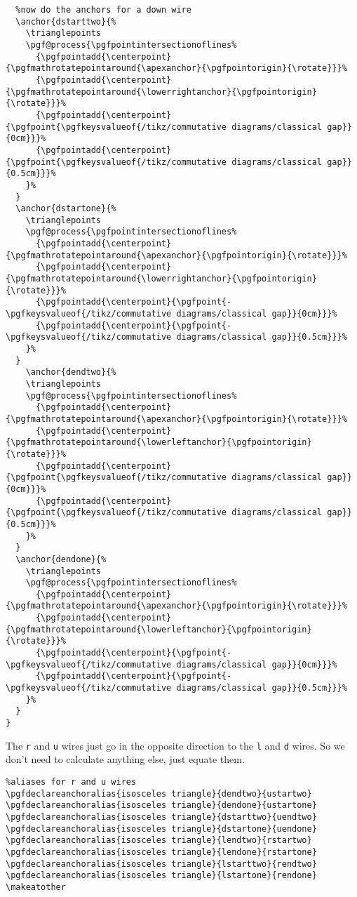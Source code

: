 \documentclass[aps,pra,10pt,nofootinbib]{revtex4-2}
\begin{document}
\begin{FullCode}
  \begin{lstlisting}
  %now do the anchors for a down wire
  \anchor{dstarttwo}{%
    \trianglepoints
    \pgf@process{\pgfpointintersectionoflines%
      {\pgfpointadd{\centerpoint}{\pgfmathrotatepointaround{\apexanchor}{\pgfpointorigin}{\rotate}}}%
      {\pgfpointadd{\centerpoint}{\pgfmathrotatepointaround{\lowerrightanchor}{\pgfpointorigin}{\rotate}}}%
      {\pgfpointadd{\centerpoint}{\pgfpoint{\pgfkeysvalueof{/tikz/commutative diagrams/classical gap}}{0cm}}}%
      {\pgfpointadd{\centerpoint}{\pgfpoint{\pgfkeysvalueof{/tikz/commutative diagrams/classical gap}}{0.5cm}}}%
    }%
  }
  \anchor{dstartone}{%
    \trianglepoints
    \pgf@process{\pgfpointintersectionoflines%
      {\pgfpointadd{\centerpoint}{\pgfmathrotatepointaround{\apexanchor}{\pgfpointorigin}{\rotate}}}%
      {\pgfpointadd{\centerpoint}{\pgfmathrotatepointaround{\lowerrightanchor}{\pgfpointorigin}{\rotate}}}%
      {\pgfpointadd{\centerpoint}{\pgfpoint{-\pgfkeysvalueof{/tikz/commutative diagrams/classical gap}}{0cm}}}%
      {\pgfpointadd{\centerpoint}{\pgfpoint{-\pgfkeysvalueof{/tikz/commutative diagrams/classical gap}}{0.5cm}}}%
    }%
  }
    \anchor{dendtwo}{%
    \trianglepoints
    \pgf@process{\pgfpointintersectionoflines%
      {\pgfpointadd{\centerpoint}{\pgfmathrotatepointaround{\apexanchor}{\pgfpointorigin}{\rotate}}}%
      {\pgfpointadd{\centerpoint}{\pgfmathrotatepointaround{\lowerleftanchor}{\pgfpointorigin}{\rotate}}}%
      {\pgfpointadd{\centerpoint}{\pgfpoint{\pgfkeysvalueof{/tikz/commutative diagrams/classical gap}}{0cm}}}%
      {\pgfpointadd{\centerpoint}{\pgfpoint{\pgfkeysvalueof{/tikz/commutative diagrams/classical gap}}{0.5cm}}}%
    }%
  }
  \anchor{dendone}{%
    \trianglepoints
    \pgf@process{\pgfpointintersectionoflines%
      {\pgfpointadd{\centerpoint}{\pgfmathrotatepointaround{\apexanchor}{\pgfpointorigin}{\rotate}}}%
      {\pgfpointadd{\centerpoint}{\pgfmathrotatepointaround{\lowerleftanchor}{\pgfpointorigin}{\rotate}}}%
      {\pgfpointadd{\centerpoint}{\pgfpoint{-\pgfkeysvalueof{/tikz/commutative diagrams/classical gap}}{0cm}}}%
      {\pgfpointadd{\centerpoint}{\pgfpoint{-\pgfkeysvalueof{/tikz/commutative diagrams/classical gap}}{0.5cm}}}%
    }%
  }
}
\end{lstlisting}
\end{FullCode}
The \texttt{r} and \texttt{u} wires just go in the opposite direction to the \texttt{l} and \texttt{d} wires. So we don't need to calculate anything else, just equate them.
\begin{FullCode}
  \begin{lstlisting}
%aliases for r and u wires
\pgfdeclareanchoralias{isosceles triangle}{dendtwo}{ustartwo}
\pgfdeclareanchoralias{isosceles triangle}{dendone}{ustartone}
\pgfdeclareanchoralias{isosceles triangle}{dstarttwo}{uendtwo}
\pgfdeclareanchoralias{isosceles triangle}{dstartone}{uendone}
\pgfdeclareanchoralias{isosceles triangle}{lendtwo}{rstartwo}
\pgfdeclareanchoralias{isosceles triangle}{lendone}{rstartone}
\pgfdeclareanchoralias{isosceles triangle}{lstarttwo}{rendtwo}
\pgfdeclareanchoralias{isosceles triangle}{lstartone}{rendone}
\makeatother
\end{lstlisting}
\end{FullCode}
\end{document}
